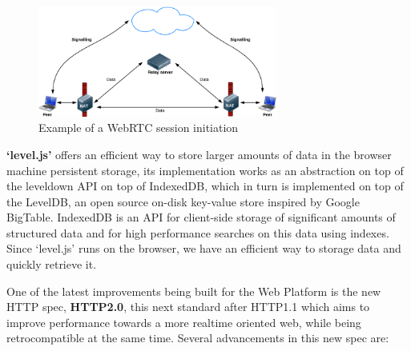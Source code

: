 \begin{figure}[h!]
  \centering
  \includegraphics[width=0.7\textwidth]{img/webrtc.png}
  \caption{Example of a WebRTC session initiation}
  \label{fig:webrtc}
\end{figure}

% 
% 

\textbf{`level.js'} offers an efficient way to store larger amounts of data in the browser machine persistent storage, its implementation works as an abstraction on top of the leveldown API on top of IndexedDB\cite{Recommendation2013}, which in turn is implemented on top of the LevelDB\cite{JeffreyDean;SanjayGhemawat}, an open source on-disk key-value store inspired by Google BigTable. IndexedDB is an API for client-side storage of significant amounts of structured data and for high performance searches on this data using indexes. Since `level.js' runs on the browser, we have an efficient way to storage data and quickly retrieve it.

One of the latest improvements being built for the Web Platform is the new HTTP spec, \textbf{HTTP2.0}\cite{Thomson2013}, this next standard after HTTP1.1 which aims to improve performance towards a more realtime oriented web, while being retrocompatible at the same time. Several advancements in this new spec are:

